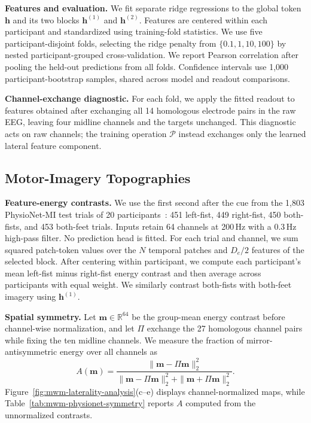 \noindent\textbf{Features and evaluation.}
We fit separate ridge regressions to the global token $\mathbf{h}$ and its two blocks $\mathbf{h}^{(1)}$ and $\mathbf{h}^{(2)}$. Features are centered within each participant and standardized using training-fold statistics. We use five participant-disjoint folds, selecting the ridge penalty from $\{0.1,1,10,100\}$ by nested participant-grouped cross-validation. We report Pearson correlation after pooling the held-out predictions from all folds. Confidence intervals use 1,000 participant-bootstrap samples, shared across model and readout comparisons.

\noindent\textbf{Channel-exchange diagnostic.}
For each fold, we apply the fitted readout to features obtained after exchanging all 14 homologous electrode pairs in the raw EEG, leaving four midline channels and the targets unchanged. This diagnostic acts on raw channels; the training operation $\mathcal{P}$ instead exchanges only the learned lateral feature component.

\subsection{Motor-Imagery Topographies}

\noindent\textbf{Feature-energy contrasts.}
We use the first second after the cue from the 1,803 PhysioNet-MI test trials of 20 participants~\citep{schalk2009eegmmidb}: 451 left-fist, 449 right-fist, 450 both-fists, and 453 both-feet trials. Inputs retain 64 channels at 200\,Hz with a 0.3\,Hz high-pass filter. No prediction head is fitted. For each trial and channel, we sum squared patch-token values over the $N$ temporal patches and $D_e/2$ features of the selected block. After centering within participant, we compute each participant's mean left-fist minus right-fist energy contrast and then average across participants with equal weight. We similarly contrast both-fists with both-feet imagery using $\mathbf{h}^{(1)}$.

\noindent\textbf{Spatial symmetry.}
Let $\mathbf{m}\in\mathbb{R}^{64}$ be the group-mean energy contrast before channel-wise normalization, and let $\Pi$ exchange the 27 homologous channel pairs while fixing the ten midline channels. We measure the fraction of mirror-antisymmetric energy over all channels as
\begin{equation}
    A(\mathbf{m})=
    \frac{\|\mathbf{m}-\Pi\mathbf{m}\|_2^2}
    {\|\mathbf{m}-\Pi\mathbf{m}\|_2^2+\|\mathbf{m}+\Pi\mathbf{m}\|_2^2}.
\end{equation}
Figure~\ref{fig:mwm-laterality-analysis}(c--e) displays channel-normalized maps, while Table~\ref{tab:mwm-physionet-symmetry} reports $A$ computed from the unnormalized contrasts.


